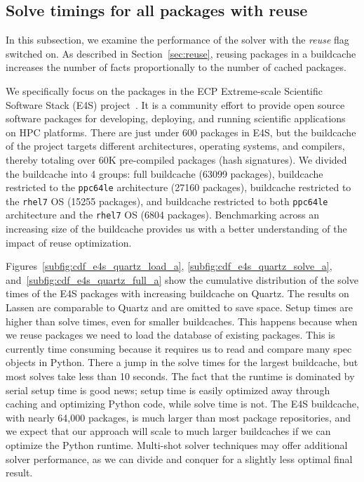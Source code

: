 
\subsection{Solve timings for all packages with reuse}

In this subsection, we examine the performance of the solver with the \emph{reuse} flag
switched on. As described in Section~\ref{sec:reuse}, reusing packages in a buildcache
increases the number of facts proportionally to the number of cached packages.

% 

% 

We specifically focus on the packages in the ECP Extreme-scale Scientific Software Stack
(E4S) project~\cite{e4s}. It is a community effort to provide open source software
packages for developing, deploying, and running scientific applications on HPC
platforms. There are just under 600 packages in E4S, but the buildcache of the project
targets different architectures, operating systems, and compilers, thereby totaling over
60K pre-compiled packages (hash signatures). We divided the buildcache into 4 groups:
full buildcache (63099 packages), buildcache restricted to the \texttt{ppc64le}
architecture (27160 packages), buildcache restricted to the \texttt{rhel7} OS (15255
packages), and buildcache restricted to both \texttt{ppc64le} architecture and the
\texttt{rhel7} OS (6804 packages). Benchmarking across an increasing size of the
buildcache provides us with a better understanding of the impact of reuse optimization.


Figures~\ref{subfig:cdf_e4s_quartz_load_a}, \ref{subfig:cdf_e4s_quartz_solve_a},
and~\ref{subfig:cdf_e4s_quartz_full_a} show the cumulative distribution of the solve
times of the E4S packages with increasing buildcache on Quartz. The results on Lassen
are comparable to Quartz and are omitted to save space. Setup times are higher than
solve times, even for smaller buildcaches. This happens because when we reuse packages
we need to load the database of existing packages. This is currently time consuming
because it requires us to read and compare many spec objects in Python. There a jump in
the solve times for the largest buildcache, but most solves take less than 10 seconds.
The fact that the runtime is dominated by serial setup time is good news; setup time is
easily optimized away through caching and optimizing Python code, while solve
time is not. The E4S buildcache, with nearly 64,000 packages, is much larger than most
package repositories, and we expect that our approach will scale to much larger
buildcaches if we can optimize the Python runtime. Multi-shot solver techniques may
offer additional solver performance, as we can divide and conquer for a slightly less
optimal final result.

% 
